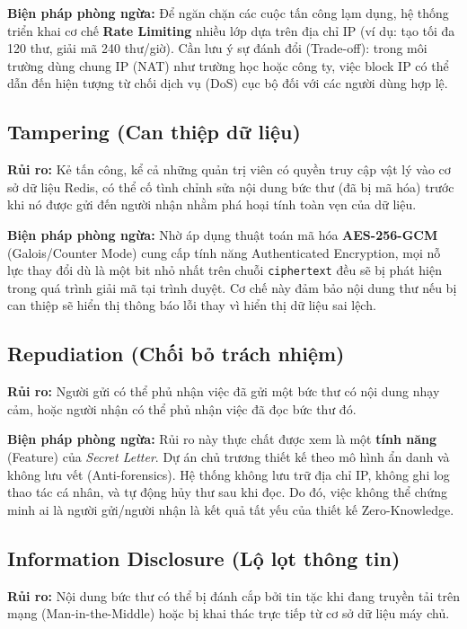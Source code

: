 \textbf{Biện pháp phòng ngừa:} Để ngăn chặn các cuộc tấn công lạm dụng, hệ thống triển khai cơ chế \textbf{Rate Limiting} nhiều lớp dựa trên địa chỉ IP (ví dụ: tạo tối đa 120 thư, giải mã 240 thư/giờ). Cần lưu ý sự đánh đổi (Trade-off): trong môi trường dùng chung IP (NAT) như trường học hoặc công ty, việc block IP có thể dẫn đến hiện tượng từ chối dịch vụ (DoS) cục bộ đối với các người dùng hợp lệ.

\subsection{Tampering (Can thiệp dữ liệu)}

\textbf{Rủi ro:} Kẻ tấn công, kể cả những quản trị viên có quyền truy cập vật lý vào cơ sở dữ liệu Redis, có thể cố tình chỉnh sửa nội dung bức thư (đã bị mã hóa) trước khi nó được gửi đến người nhận nhằm phá hoại tính toàn vẹn của dữ liệu.

\textbf{Biện pháp phòng ngừa:} Nhờ áp dụng thuật toán mã hóa \textbf{AES-256-GCM} (Galois/Counter Mode) cung cấp tính năng Authenticated Encryption, mọi nỗ lực thay đổi dù là một bit nhỏ nhất trên chuỗi \texttt{ciphertext} đều sẽ bị phát hiện trong quá trình giải mã tại trình duyệt. Cơ chế này đảm bảo nội dung thư nếu bị can thiệp sẽ hiển thị thông báo lỗi thay vì hiển thị dữ liệu sai lệch.

\subsection{Repudiation (Chối bỏ trách nhiệm)}

\textbf{Rủi ro:} Người gửi có thể phủ nhận việc đã gửi một bức thư có nội dung nhạy cảm, hoặc người nhận có thể phủ nhận việc đã đọc bức thư đó.

\textbf{Biện pháp phòng ngừa:} Rủi ro này thực chất được xem là một \textbf{tính năng} (Feature) của \textit{Secret Letter}. Dự án chủ trương thiết kế theo mô hình ẩn danh và không lưu vết (Anti-forensics). Hệ thống không lưu trữ địa chỉ IP, không ghi log thao tác cá nhân, và tự động hủy thư sau khi đọc. Do đó, việc không thể chứng minh ai là người gửi/người nhận là kết quả tất yếu của thiết kế Zero-Knowledge.

\subsection{Information Disclosure (Lộ lọt thông tin)}

\textbf{Rủi ro:} Nội dung bức thư có thể bị đánh cắp bởi tin tặc khi đang truyền tải trên mạng (Man-in-the-Middle) hoặc bị khai thác trực tiếp từ cơ sở dữ liệu máy chủ.

